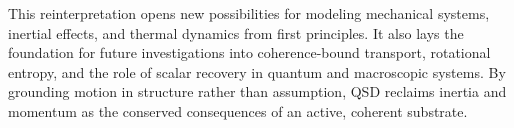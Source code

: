 \documentclass[entropy,article,submit,pdftex,moreauthors]{Definitions/mdpi}
\begin{document}
This reinterpretation opens new possibilities for modeling mechanical systems, inertial effects, and thermal dynamics from first principles. It also lays the foundation for future investigations into coherence-bound transport, rotational entropy, and the role of scalar recovery in quantum and macroscopic systems. By grounding motion in structure rather than assumption, QSD reclaims inertia and momentum as the conserved consequences of an active, coherent substrate.



\vspace{6pt} 




\end{document}
